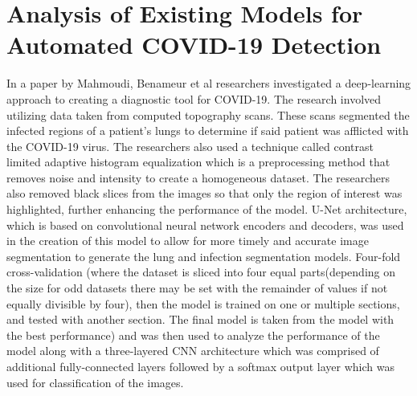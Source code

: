 \section{Analysis of Existing Models for Automated COVID-19 Detection}
In a paper by Mahmoudi, Benameur et al \cite{litReviewDeepLearningCovid19} researchers investigated a deep-learning approach to creating a diagnostic tool for COVID-19.  The research involved utilizing data taken from computed topography scans.  These scans segmented the infected regions of a patient's lungs to determine if said patient was afflicted with the COVID-19 virus.  The researchers also used a technique called contrast limited adaptive histogram equalization which is a preprocessing method that removes noise and intensity to create a homogeneous dataset.  The researchers also removed black slices from the images so that only the region of interest was highlighted, further enhancing the performance of the model.  U-Net architecture, which is based on convolutional neural network encoders and decoders, was used in the creation of this model to allow for more timely and accurate image segmentation to generate the lung and infection segmentation models.  Four-fold cross-validation (where the dataset is sliced into four equal parts(depending on the size for odd datasets there may be set with the remainder of values if not equally divisible by four), then the model is trained on one or multiple sections, and tested with another section. The final model is taken from the model with the best performance) and was then used to analyze the performance of the model along with a three-layered CNN architecture which was comprised of additional fully-connected layers followed by a softmax output layer which was used for classification of the images. 
